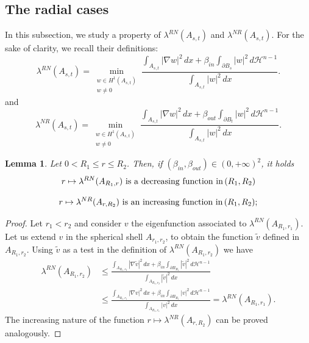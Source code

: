 \documentclass[oneside,a4paper,11pt,notitlepage]{article}
\newcommand{\abs}[1]{{\left|#1\right|}}
\theoremstyle{plain}
\numberwithin{teor}{section}
\numberwithin{equation}{section}
\theoremstyle{definition}
\theoremstyle{plain}
\newtheorem{lemma}[lemma]{Lemma}
\theoremstyle{plain}
\theoremstyle{plain}
\theoremstyle{plain}
\theoremstyle{definition}
\theoremstyle{definition}
\theoremstyle{plain}
\begin{document}
\subsection{The radial cases}
In this subsection, we study a property of $\lambda^{RN}(A_{s,t})$ and $\lambda^{NR}(A_{s,t})$. For the sake of clarity, we recall their definitions:
\begin{equation*}
    \label{ARN}
    \lambda^{RN}(A_{s,t})=\min_{\substack{w\in H^{1}(A_{s,t}) \\ w \neq 0}} \frac{\displaystyle{\int_{A_{s,t}} \abs{\nabla w}^2\, dx+\beta_{in} \int_{\partial B_s} \abs{w}^2\, d\mathcal{H}^{n-1}}}{\displaystyle{\int_{A_{s,t}} \abs{w}^2\, dx}}.
\end{equation*}
and 
\begin{equation*}
    \label{ANR}
    \lambda^{NR}(A_{s,t})=\min_{\substack{w\in H^{1}(A_{s,t}) \\ w \neq 0}} \frac{\displaystyle{\int_{A_{s,t}} \abs{\nabla w}^2\, dx+\beta_{out} \int_{\partial B_t} \abs{w}^2\, d\mathcal{H}^{n-1}}}{\displaystyle{\int_{A_{s,t}} \abs{w}^2\, dx}}.
\end{equation*}
\begin{lemma}\label{incrdecr}
Let $0< R_1 \leq r \leq R_2$. Then, if $(\beta_{in}, \beta_{out}) \in (0, + \infty)^2$, it holds 
 $$r \mapsto \lambda^{RN}(A_{R_1,r}) \,\,\textnormal{is a decreasing function in}\, (R_1, R_2)$$

 $$r \mapsto \lambda^{NR}(A_{r,R_2}) \,\,\textnormal{is an increasing function in}\, (R_1, R_2);$$

\end{lemma}
\begin{proof}
Let $r_1<r_2$ and consider $v$ the eigenfunction associated to $\lambda^{RN}(A_{R_1,r_1})$. Let us extend $v$ in the spherical shell $A_{r_1,r_2}$, to obtain the function $\tilde v$ defined in $A_{R_1,r_2}$. Using $\tilde v$ as a test in the definition of $\lambda^{RN}(A_{R_1,r_2})$ we have \begin{equation*}
   \begin{aligned}
       \lambda^{RN}(A_{R_1,r_2})&\leq \frac{\displaystyle{\int_{A_{R_1,r_2}} \abs{\nabla \tilde v}^2\, dx+\beta_{in} \int_{\partial B_{R_1}} \abs{\tilde v}^2\, d\mathcal{H}^{n-1}}}{\displaystyle{\int_{A_{R_1,r_2}} \abs{\tilde v}^2\, dx}}\\ &\leq \frac{\displaystyle{\int_{A_{R_1,r_1}} \abs{\nabla v}^2\, dx+\beta_{in} \int_{\partial B_{R_1}} \abs{v}^2\, d\mathcal{H}^{n-1}}}{\displaystyle{\int_{A_{R_1,r_1}} \abs{v}^2\, dx}} = \lambda^{RN}(A_{R_1,r_1}).
   \end{aligned}
\end{equation*} 
The increasing nature of the function $r \mapsto \lambda^{NR}(A_{r,R_2})$ can be proved analogously.
\end{proof}
\end{document}
